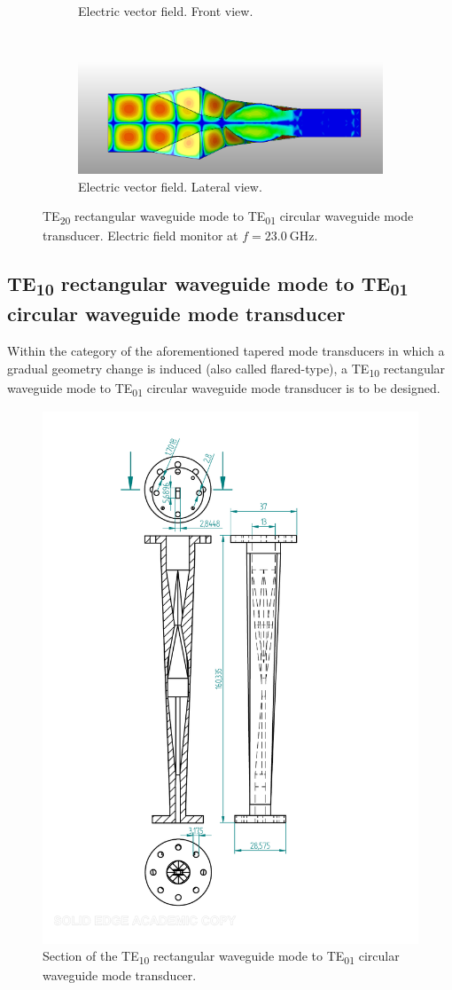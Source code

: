 \documentclass[english,twoside]{article}
\begin{document}
\begin{landscape}
\begin{figure}
\begin{subfigure}[b]{0.45\textwidth}
					\caption{Electric vector field. Front view.}
				\end{subfigure}
				\vspace{10pt}\newline
				~
				\begin{subfigure}[b]{.6\textwidth}
					\includegraphics[width=\textwidth]{figures/wrTE20ToWcTE01_lateral}
					\caption{Electric vector field. Lateral view.}
				\end{subfigure}
				\caption{TE\textsubscript{20} rectangular waveguide mode to TE\textsubscript{01} circular waveguide mode transducer. Electric field monitor at $f=\SI{23.0}{\giga\hertz}$.}
			\end{figure}
		\end{landscape}
	
		
	
	\newpage
	\subsection{TE\textsubscript{10} rectangular waveguide mode to TE\textsubscript{01} circular waveguide mode transducer}
    Within the category of the aforementioned tapered mode transducers in which a gradual geometry change is induced (also called flared-type), a \ac{TE}\textsubscript{10} rectangular waveguide mode to \ac{TE}\textsubscript{01} circular waveguide mode transducer is to be designed.\\
    
    \begin{figure}
    	\centering
    	\includegraphics[width=.3\textwidth]{figures/marie_plano}
    	\caption{Section of the TE\textsubscript{10} rectangular waveguide mode to TE\textsubscript{01} circular waveguide mode transducer.}
    	\label{fig:marie_plano}
    \end{figure}
    
\end{document}

